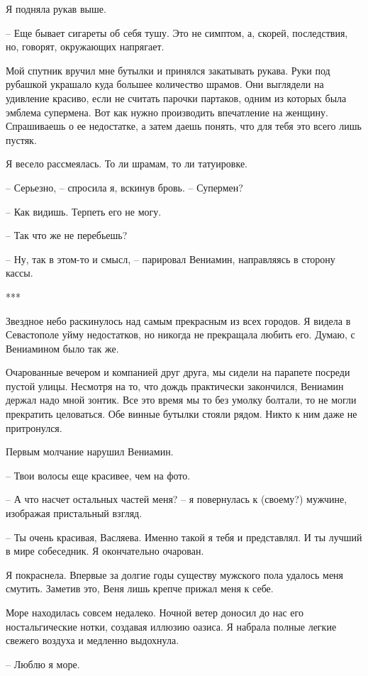 \documentclass[
]{book}
\begin{document}
Я подняла рукав выше.

-- Еще бывает сигареты об себя тушу. Это не симптом, а, скорей, последствия, но, говорят, окружающих напрягает.

Мой спутник вручил мне бутылки и принялся закатывать рукава. Руки под рубашкой украшало куда большее количество шрамов. Они выглядели на удивление красиво, если не считать парочки партаков, одним из которых была эмблема супермена. Вот как нужно производить впечатление на женщину. Спрашиваешь о ее недостатке, а затем даешь понять, что для тебя это всего лишь пустяк.

Я весело рассмеялась. То ли шрамам, то ли татуировке.

-- Серьезно, -- спросила я, вскинув бровь. -- Супермен?

-- Как видишь. Терпеть его не могу.

-- Так что же не перебьешь?

-- Ну, так в этом-то и смысл, -- парировал Вениамин, направляясь в сторону кассы.

***

Звездное небо раскинулось над самым прекрасным из всех городов. Я видела в Севастополе уйму недостатков, но никогда не прекращала любить его. Думаю, с Вениамином было так же.

Очарованные вечером и компанией друг друга, мы сидели на парапете посреди пустой улицы. Несмотря на то, что дождь практически закончился, Вениамин держал надо мной зонтик. Все это время мы то без умолку болтали, то не могли прекратить целоваться. Обе винные бутылки стояли рядом. Никто к ним даже не притронулся.

Первым молчание нарушил Вениамин.

-- Твои волосы еще красивее, чем на фото.

-- А что насчет остальных частей меня? -- я повернулась к (своему?) мужчине, изображая пристальный взгляд.

-- Ты очень красивая, Васляева. Именно такой я тебя и представлял. И ты лучший в мире собеседник. Я окончательно очарован.

Я покраснела. Впервые за долгие годы существу мужского пола удалось меня смутить. Заметив это, Веня лишь крепче прижал меня к себе.

Море находилась совсем недалеко. Ночной ветер доносил до нас его ностальгические нотки, создавая иллюзию оазиса. Я набрала полные легкие свежего воздуха и медленно выдохнула.

-- Люблю я море.
\end{document}
